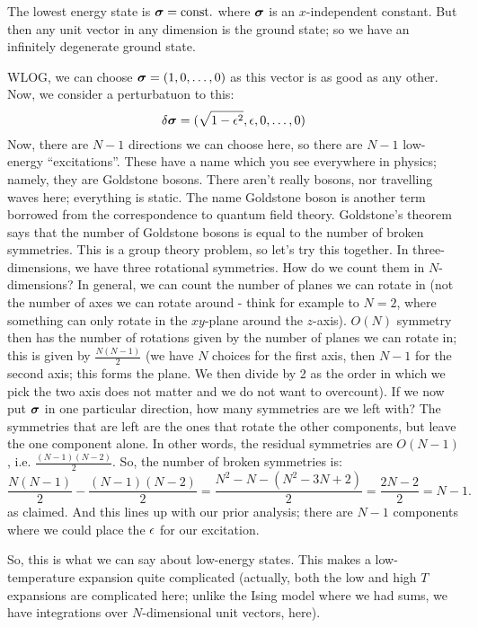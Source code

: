 The lowest energy state is $\mbox{\boldmath$ \sigma $} = \text{const.}$ where $\mbox{\boldmath$ \sigma $}$ is an $x$-independent constant. But then any unit vector in any dimension is the ground state; so we have an infinitely degenerate ground state.

WLOG, we can choose $\mbox{\boldmath$ \sigma $} = (1, 0, \ldots, 0)$ as this vector is as good as any other. Now, we consider a perturbatuon to this:
\begin{equation}
    \delta\mbox{\boldmath$ \sigma $} = (\sqrt{1-\epsilon^2}, \epsilon, 0, \ldots, 0)
\end{equation}
Now, there are $N-1$ directions we can choose here, so there are $N - 1$ low-energy ``excitations''. These have a name which you see everywhere in physics; namely, they are Goldstone bosons. There aren't really bosons, nor travelling waves here; everything is static. The name Goldstone boson is another term borrowed from the correspondence to quantum field theory. Goldstone's theorem says that the number of Goldstone bosons is equal to the number of broken symmetries. This is a group theory problem, so let's try this together. In three-dimensions, we have three rotational symmetries. How do we count them in $N$-dimensions? In general, we can count the number of planes we can rotate in (not the number of axes we can rotate around - think for example to $N = 2$, where something can only rotate in the $xy$-plane around the $z$-axis). $O(N)$ symmetry then has the number of rotations given by the number of planes we can rotate in; this is given by $\frac{N(N-1)}{2}$ (we have $N$ choices for the first axis, then $N-1$ for the second axis; this forms the plane. We then divide by 2 as the order in which we pick the two axis does not matter and we do not want to overcount). If we now put $\mbox{\boldmath$ \sigma $}$ in one particular direction, how many symmetries are we left with? The symmetries that are left are the ones that rotate the other components, but leave the one component alone. In other words, the residual symmetries are $O(N-1)$, i.e. $\frac{(N-1)(N-2)}{2}$. So, the number of broken symmetries is:
\begin{equation}
    \frac{N(N-1)}{2} - \frac{(N-1)(N-2)}{2} = \frac{N^2 - N - (N^2 - 3N + 2)}{2} = \frac{2N - 2}{2} = N-1.
\end{equation}
as claimed. And this lines up with our prior analysis; there are $N - 1$ components where we could place the $\epsilon$ for our excitation.

So, this is what we can say about low-energy states. This makes a low-temperature expansion quite complicated (actually, both the low and high $T$ expansions are complicated here; unlike the Ising model where we had sums, we have integrations over $N$-dimensional unit vectors, here).


